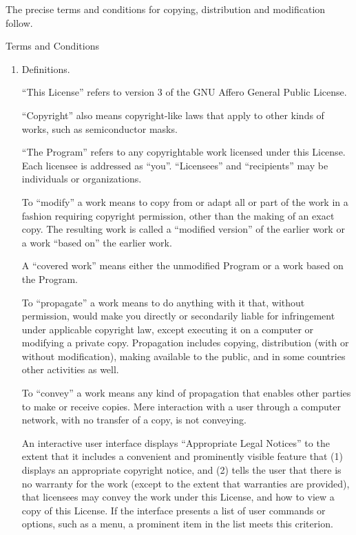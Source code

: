 \documentclass{article}%
\begin{document}
The precise terms and conditions for copying, distribution and
modification follow.

\begin{center}
{\Large \sc Terms and Conditions}
\end{center}

\begin{enumerate}

\addtocounter{enumi}{-1}

\item Definitions.

``This License'' refers to version 3 of the GNU Affero General Public License.

``Copyright'' also means copyright-like laws that apply to other kinds of
works, such as semiconductor masks.

``The Program'' refers to any copyrightable work licensed under this
License.        Each licensee is addressed as ``you''.  ``Licensees'' and
``recipients'' may be individuals or organizations.

To ``modify'' a work means to copy from or adapt all or part of the work
in a fashion requiring copyright permission, other than the making of an
exact copy.      The resulting work is called a ``modified version'' of the
earlier work or a work ``based on'' the earlier work.

A ``covered work'' means either the unmodified Program or a work based
on the Program.

To ``propagate'' a work means to do anything with it that, without
permission, would make you directly or secondarily liable for
infringement under applicable copyright law, except executing it on a
computer or modifying a private copy.    Propagation includes copying,
distribution (with or without modification), making available to the
public, and in some countries other activities as well.

To ``convey'' a work means any kind of propagation that enables other
parties to make or receive copies.      Mere interaction with a user through
a computer network, with no transfer of a copy, is not conveying.

An interactive user interface displays ``Appropriate Legal Notices''
to the extent that it includes a convenient and prominently visible
feature that (1) displays an appropriate copyright notice, and (2)
tells the user that there is no warranty for the work (except to the
extent that warranties are provided), that licensees may convey the
work under this License, and how to view a copy of this License.        If
the interface presents a list of user commands or options, such as a
menu, a prominent item in the list meets this criterion.


\end{enumerate}
\end{document}
